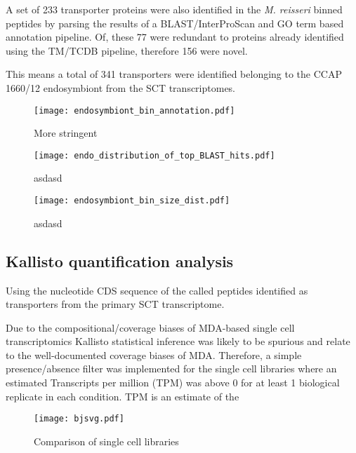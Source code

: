 A set of 233 
transporter proteins were also identified 
in the \textit{M. reisseri} binned peptides
by parsing the results of a 
BLAST/InterProScan and GO term based annotation pipeline.
Of, these 77 were redundant to proteins already identified using
the TM/TCDB pipeline, therefore 156 were novel.

This means a total of 341 transporters were identified 
belonging to the CCAP 1660/12 endosymbiont from the SCT transcriptomes. 







\begin{figure}
    \centering
    \texttt{[image: endosymbiont\_bin\_annotation.pdf]}
    \caption{More stringent} 
\end{figure}



\begin{figure}
    \centering
    \texttt{[image: endo\_distribution\_of\_top\_BLAST\_hits.pdf]}
    \caption[Endostymbiont Bin Top BLAST Hits]{asdasd}
\end{figure}


\begin{figure}
    \centering
    \texttt{[image: endosymbiont\_bin\_size\_dist.pdf]}
    \caption{asdasd}
\end{figure}






\subsection{Kallisto quantification analysis}

Using the nucleotide CDS sequence of the called peptides identified as transporters
from the primary SCT transcriptome. 

Due to the compositional/coverage biases of MDA-based single cell transcriptomics 
Kallisto statistical inference was likely to be spurious and relate to the 
well-documented coverage biases of MDA. Therefore, a simple presence/absence
filter was implemented for the single cell libraries where an estimated
Transcripts per million (TPM) was above 0 for at least 1 biological replicate
in each condition. 
TPM is an estimate of the 

\begin{figure}
	\texttt{[image: bjsvg.pdf]}
    \caption[Jasper-Shannon Divergence of Single Cell Libararies]{Comparison of single cell libraries}
\label{fig:jsd}
\end{figure}


